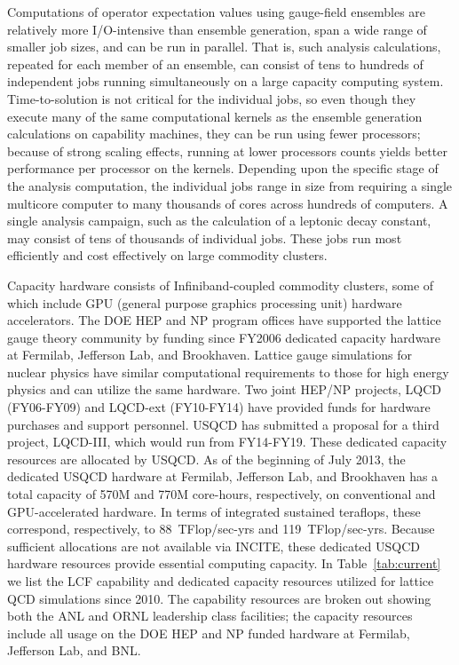 Computations of operator expectation values using gauge-field ensembles are
relatively more I/O-intensive than ensemble generation, span a wide range of
smaller job sizes, and can be run in parallel.  That is, such analysis
calculations, repeated for each member of an ensemble, can consist of tens to
hundreds of independent jobs running simultaneously on a large capacity
computing system.  Time-to-solution is not critical for the individual jobs,
so even though they execute many of the same computational kernels as the
ensemble generation calculations on capability machines, they can be run using
fewer processors; because of strong scaling effects, running at lower
processors counts yields better performance per processor on the kernels.
Depending upon the specific stage of the analysis computation, the individual
jobs range in size from requiring a single multicore computer to many
thousands of cores across hundreds of computers.  A single analysis campaign,
such as the calculation of a leptonic decay constant, may consist of tens of
thousands of individual jobs.  These jobs run most efficiently and cost
effectively on large commodity clusters.

Capacity hardware consists of Infiniband-coupled commodity clusters, some of
which include GPU (general purpose graphics processing unit) hardware
accelerators.  The DOE HEP and NP program offices have supported the lattice
gauge theory community by funding since FY2006 dedicated capacity hardware at
Fermilab, Jefferson Lab, and Brookhaven.  Lattice gauge simulations for
nuclear physics have similar computational requirements to those for high
energy physics and can utilize the same hardware.  Two joint HEP/NP projects,
LQCD (FY06-FY09) and LQCD-ext (FY10-FY14) have provided funds for hardware
purchases and support personnel.  USQCD has submitted a proposal for a third
project, LQCD-III, which would run from FY14-FY19.  These dedicated capacity
resources are allocated by USQCD.  As of the beginning of July 2013, the
dedicated USQCD hardware at Fermilab, Jefferson Lab, and Brookhaven has a
total capacity of 570M and 770M core-hours, respectively, on conventional and
GPU-accelerated hardware.  In terms of integrated sustained teraflops, these
correspond, respectively, to 88~TFlop/sec-yrs and 119~TFlop/sec-yrs.
Because sufficient allocations are not available via INCITE, these dedicated
USQCD hardware resources provide essential computing capacity.
In Table~\ref{tab:current} we list the LCF capability and dedicated
capacity resources utilized for lattice QCD simulations since 2010.
The capability resources are broken out showing both the ANL and ORNL
leadership class facilities; the capacity resources include all usage  on the 
DOE HEP and NP funded hardware at Fermilab, Jefferson Lab, and BNL.

